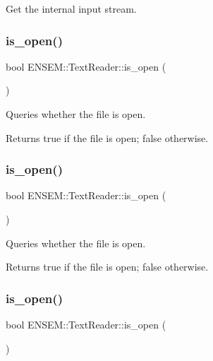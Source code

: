 Get the internal input stream. 

\mbox{\label{classENSEM_1_1TextReader_a67e8ac68ff413c1101522eedafc2d994}} 
\subsubsection{\texorpdfstring{is\_open()}{is\_open()}\hspace{0.1cm}{\footnotesize\ttfamily [1/3]}}
{\footnotesize\ttfamily bool E\+N\+S\+E\+M\+::\+Text\+Reader\+::is\+\_\+open (\begin{DoxyParamCaption}{ }\end{DoxyParamCaption})}



Queries whether the file is open. 

\begin{DoxyReturn}{Returns}
true if the file is open; false otherwise. 
\end{DoxyReturn}
\mbox{\label{classENSEM_1_1TextReader_a67e8ac68ff413c1101522eedafc2d994}} 
\subsubsection{\texorpdfstring{is\_open()}{is\_open()}\hspace{0.1cm}{\footnotesize\ttfamily [2/3]}}
{\footnotesize\ttfamily bool E\+N\+S\+E\+M\+::\+Text\+Reader\+::is\+\_\+open (\begin{DoxyParamCaption}{ }\end{DoxyParamCaption})}



Queries whether the file is open. 

\begin{DoxyReturn}{Returns}
true if the file is open; false otherwise. 
\end{DoxyReturn}
\mbox{\label{classENSEM_1_1TextReader_a67e8ac68ff413c1101522eedafc2d994}} 
\subsubsection{\texorpdfstring{is\_open()}{is\_open()}\hspace{0.1cm}{\footnotesize\ttfamily [3/3]}}
{\footnotesize\ttfamily bool E\+N\+S\+E\+M\+::\+Text\+Reader\+::is\+\_\+open (\begin{DoxyParamCaption}{ }\end{DoxyParamCaption})}



